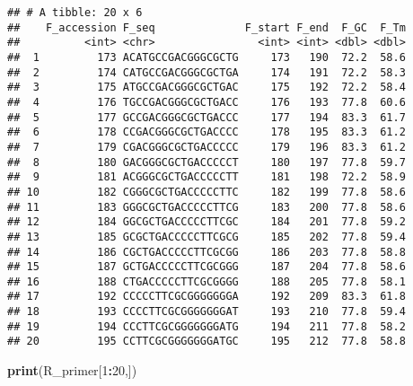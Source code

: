 \documentclass[
]{article}
\newenvironment{Shaded}{\begin{snugshade}}{\end{snugshade}}
\newcommand{\DecValTok}[1]{\textcolor[rgb]{0.00,0.00,0.81}{#1}}
\newcommand{\FunctionTok}[1]{\textcolor[rgb]{0.13,0.29,0.53}{\textbf{#1}}}
\newcommand{\NormalTok}[1]{#1}
\newcommand{\SpecialCharTok}[1]{\textcolor[rgb]{0.81,0.36,0.00}{\textbf{#1}}}
\begin{document}
\begin{verbatim}
## # A tibble: 20 x 6
##    F_accession F_seq              F_start F_end  F_GC  F_Tm
##          <int> <chr>                <int> <int> <dbl> <dbl>
##  1         173 ACATGCCGACGGGCGCTG     173   190  72.2  58.6
##  2         174 CATGCCGACGGGCGCTGA     174   191  72.2  58.3
##  3         175 ATGCCGACGGGCGCTGAC     175   192  72.2  58.4
##  4         176 TGCCGACGGGCGCTGACC     176   193  77.8  60.6
##  5         177 GCCGACGGGCGCTGACCC     177   194  83.3  61.7
##  6         178 CCGACGGGCGCTGACCCC     178   195  83.3  61.2
##  7         179 CGACGGGCGCTGACCCCC     179   196  83.3  61.2
##  8         180 GACGGGCGCTGACCCCCT     180   197  77.8  59.7
##  9         181 ACGGGCGCTGACCCCCTT     181   198  72.2  58.9
## 10         182 CGGGCGCTGACCCCCTTC     182   199  77.8  58.6
## 11         183 GGGCGCTGACCCCCTTCG     183   200  77.8  58.6
## 12         184 GGCGCTGACCCCCTTCGC     184   201  77.8  59.2
## 13         185 GCGCTGACCCCCTTCGCG     185   202  77.8  59.4
## 14         186 CGCTGACCCCCTTCGCGG     186   203  77.8  58.8
## 15         187 GCTGACCCCCTTCGCGGG     187   204  77.8  58.6
## 16         188 CTGACCCCCTTCGCGGGG     188   205  77.8  58.1
## 17         192 CCCCCTTCGCGGGGGGGA     192   209  83.3  61.8
## 18         193 CCCCTTCGCGGGGGGGAT     193   210  77.8  59.4
## 19         194 CCCTTCGCGGGGGGGATG     194   211  77.8  58.2
## 20         195 CCTTCGCGGGGGGGATGC     195   212  77.8  58.8
\end{verbatim}

\begin{Shaded}
\begin{Highlighting}[]
\FunctionTok{print}\NormalTok{(R\_primer[}\DecValTok{1}\SpecialCharTok{:}\DecValTok{20}\NormalTok{,])}
\end{Highlighting}
\end{Shaded}
\end{document}
